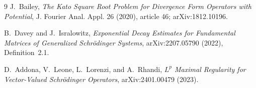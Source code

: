 \documentclass[11pt]{article}
\begin{document}
\begin{thebibliography}{9}
J.~Bailey,
\emph{The Kato Square Root Problem for Divergence Form Operators with
Potential}, J. Fourier Anal. Appl. 26 (2020), article 46;
arXiv:1812.10196.

B.~Davey and J.~Isralowitz,
\emph{Exponential Decay Estimates for Fundamental Matrices of Generalized
Schr\"odinger Systems}, arXiv:2207.05790 (2022), Definition~2.1.

D.~Addona, V.~Leone, L.~Lorenzi, and A.~Rhandi,
\emph{$L^p$ Maximal Regularity for Vector-Valued Schr\"odinger Operators},
arXiv:2401.00479 (2023).
\end{thebibliography}
\end{document}
